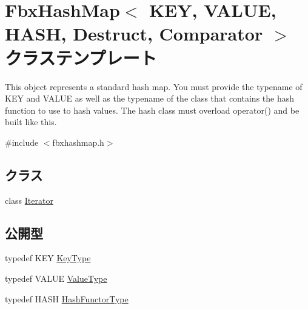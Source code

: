 \hypertarget{class_fbx_hash_map}{}\section{Fbx\+Hash\+Map$<$ K\+EY, V\+A\+L\+UE, H\+A\+SH, Destruct, Comparator $>$ クラステンプレート}
\label{class_fbx_hash_map}


This object represents a standard hash map. You must provide the typename of K\+EY and V\+A\+L\+UE as well as the typename of the class that contains the hash function to use to hash values. The hash class must overload operator() and be built like this.  




{\ttfamily \#include $<$fbxhashmap.\+h$>$}

\subsection*{クラス}
\begin{DoxyCompactItemize}
\item 
class \hyperlink{class_fbx_hash_map_1_1_iterator}{Iterator}
\end{DoxyCompactItemize}
\subsection*{公開型}
\begin{DoxyCompactItemize}
\item 
typedef K\+EY \hyperlink{class_fbx_hash_map_ab56799173b6c58b676a94370b64ddbb0}{Key\+Type}
\item 
typedef V\+A\+L\+UE \hyperlink{class_fbx_hash_map_a9c4cfd0138aa9233c119403f3cc85501}{Value\+Type}
\item 
typedef H\+A\+SH \hyperlink{class_fbx_hash_map_a254381e9c4bde567aaf9d7286d753bd7}{Hash\+Functor\+Type}
\end{DoxyCompactItemize}
